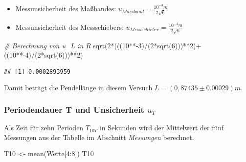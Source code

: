 \documentclass[
  9pt,
]{article}
\newenvironment{Shaded}{\begin{snugshade}}{\end{snugshade}}
\newcommand{\CommentTok}[1]{\textcolor[rgb]{0.56,0.35,0.01}{\textit{#1}}}
\newcommand{\DecValTok}[1]{\textcolor[rgb]{0.00,0.00,0.81}{#1}}
\newcommand{\FunctionTok}[1]{\textcolor[rgb]{0.00,0.00,0.00}{#1}}
\newcommand{\NormalTok}[1]{#1}
\newcommand{\OtherTok}[1]{\textcolor[rgb]{0.56,0.35,0.01}{#1}}
\newcommand{\SpecialCharTok}[1]{\textcolor[rgb]{0.00,0.00,0.00}{#1}}
\begin{document}
\begin{itemize}
  \item Messunsicherheit des Maßbandes: $u_{Massband}=\frac{10^{-3}m}{2\sqrt{6}}$
  \item Messunsicherheit des Messschiebers: $u_{Messschieber}=\frac{10^{-4}m}{2\sqrt{6}}$
\end{itemize}

\begin{Shaded}
\begin{Highlighting}[]
\CommentTok{\# Berechnung von u\_L in R}
\FunctionTok{sqrt}\NormalTok{(}\DecValTok{2}\SpecialCharTok{*}\NormalTok{(((}\DecValTok{10}\SpecialCharTok{**{-}}\DecValTok{3}\NormalTok{)}\SpecialCharTok{/}\NormalTok{(}\DecValTok{2}\SpecialCharTok{*}\FunctionTok{sqrt}\NormalTok{(}\DecValTok{6}\NormalTok{)))}\SpecialCharTok{**}\DecValTok{2}\NormalTok{)}\SpecialCharTok{+}\NormalTok{((}\DecValTok{10}\SpecialCharTok{**{-}}\DecValTok{4}\NormalTok{)}\SpecialCharTok{/}\NormalTok{(}\DecValTok{2}\SpecialCharTok{*}\FunctionTok{sqrt}\NormalTok{(}\DecValTok{6}\NormalTok{)))}\SpecialCharTok{**}\DecValTok{2}\NormalTok{)}
\end{Highlighting}
\end{Shaded}

\begin{verbatim}
## [1] 0.0002893959
\end{verbatim}

Damit beträgt die Pendellänge in diesem Versuch
\(L = (0,87435 \pm 0.00029)m\).

\hypertarget{periodendauer-t-und-unsicherheit-u_t}{%
\subsubsection{\texorpdfstring{Periodendauer T und Unsicherheit
\(u_T\)}{Periodendauer T und Unsicherheit u\_T}}\label{periodendauer-t-und-unsicherheit-u_t}}

Als Zeit für zehn Perioden \(T_{10T}\) in Sekunden wird der Mittelwert
der fünf Messungen aus der Tabelle im Abschnitt \textit{Messungen}
berechnet.

\begin{Shaded}
\begin{Highlighting}[]
\NormalTok{T10 }\OtherTok{\textless{}{-}} \FunctionTok{mean}\NormalTok{(Werte[}\DecValTok{4}\SpecialCharTok{:}\DecValTok{8}\NormalTok{])}
\NormalTok{T10}
\end{Highlighting}
\end{Shaded}
\end{document}
